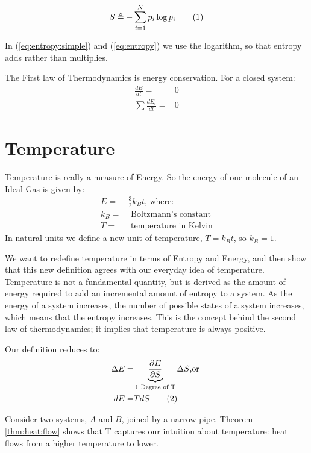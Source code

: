 \documentclass[]{article}
\newcommand\numberthis{\addtocounter{equation}{1}\tag{\theequation}}
\begin{document}
\begin{align*}
S \triangleq - \sum_{i=1}^{N} p_i \log{p_i} \numberthis \label{eq:entropy}
\end{align*}


In (\ref{eq:entropy:simple}) and (\ref{eq:entropy}) we use the logarithm, so that entropy adds rather than multiplies.

The First law of Thermodynamics is energy conservation. For a closed system:
\begin{align*}
\frac{dE}{dt} =& 0\\
\sum \frac{dE_i}{dt} =& 0
\end{align*}


\section{Temperature}


Temperature is really a measure of Energy. So the energy of one molecule of an Ideal Gas is given by:
\begin{align*}
E =& \frac{3}{2} k_B t\text{, where:}\\
k_B =& \text{ Boltzmann's constant}\\
T =& \text{ temperature in Kelvin}
\end{align*}
 In natural units we define a new unit of temperature, $T=k_Bt$, so $k_B=1$.
 
 We want to redefine temperature in terms of Entropy and Energy, and then show that this new definition agrees with our everyday idea of temperature. Temperature is not a fundamental quantity, but is derived as the amount of energy required to add an incremental amount of entropy to a system.  As the energy of a system increases, the number of possible states of a system increases, which means that the entropy increases.  This is the concept behind the second law of thermodynamics; it implies that temperature is always positive.
 
 Our definition reduces to:
\begin{align*}
\Delta E =& \underbrace{\frac{\partial E}{\partial S}}_\text{1 Degree of T} \Delta S\text{,or }\\
dE =& T dS \numberthis \label{eq:T}
\end{align*}

Consider two systems, $A$ and $B$, joined by a narrow pipe. Theorem \ref{thm:heat:flow} shows that T captures our intuition about temperature: heat flows from a higher temperature to lower.
\end{document}
